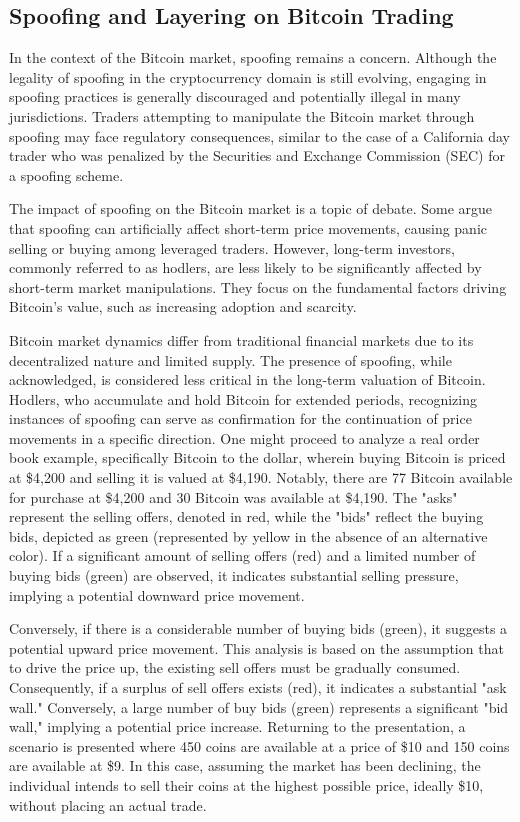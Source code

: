 \subsection{Spoofing and Layering on Bitcoin Trading}
In the context of the Bitcoin market, spoofing remains a concern. Although the legality of spoofing in the cryptocurrency
domain is still evolving, engaging in spoofing practices is generally discouraged and potentially illegal in many jurisdictions.
Traders attempting to manipulate the Bitcoin market through spoofing may face regulatory consequences, similar to the case
of a California day trader who was penalized by the Securities and Exchange Commission (SEC) for a spoofing scheme.

The impact of spoofing on the Bitcoin market is a topic of debate. Some argue that spoofing can artificially affect
short-term price movements, causing panic selling or buying among leveraged traders. However, long-term investors,
commonly referred to as hodlers, are less likely to be significantly affected by short-term market manipulations. They
focus on the fundamental factors driving Bitcoin's value, such as increasing adoption and scarcity.

Bitcoin market dynamics differ from traditional financial markets due to its decentralized nature and limited supply.
The presence of spoofing, while acknowledged, is considered less critical in the long-term valuation of Bitcoin. Hodlers,
who accumulate and hold Bitcoin for extended periods, recognizing instances of spoofing can serve as confirmation for the
continuation of price movements in a specific direction.
One might proceed to analyze a real order book example, specifically Bitcoin to the dollar, wherein buying Bitcoin is priced
at \$4,200 and selling it is valued at \$4,190. Notably, there are 77 Bitcoin available for purchase at \$4,200 and 30
Bitcoin was available at \$4,190. The "asks" represent the selling offers, denoted in red, while the "bids" reflect the buying
bids, depicted as green (represented by yellow in the absence of an alternative color). If a significant amount of selling
offers (red) and a limited number of buying bids (green) are observed, it indicates substantial selling pressure, implying
a potential downward price movement.

Conversely, if there is a considerable number of buying bids (green), it suggests a potential upward price movement. This
analysis is based on the assumption that to drive the price up, the existing sell offers must be gradually consumed.
Consequently, if a surplus of sell offers exists (red), it indicates a substantial "ask wall." Conversely, a large number
of buy bids (green) represents a significant "bid wall," implying a potential price increase. Returning to the presentation,
a scenario is presented where 450 coins are available at a price of \$10 and 150 coins are available at \$9. In this case,
assuming the market has been declining, the individual intends to sell their coins at the highest possible price, ideally
\$10, without placing an actual trade.

